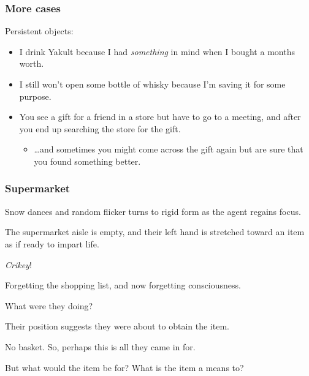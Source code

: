 \documentclass[noamssymb,
]{beamer} %
\begin{document}
\begin{frame}
  \frametitle{More cases}

  Persistent objects:
\begin{itemize}
\item I drink Yakult because I had \emph{something} in mind when I bought a months worth.
\item I still won't open some bottle of whisky because I'm saving it for some purpose.
\item You see a gift for a friend in a store but have to go to a meeting, and after you end up searching the store for the gift.
  \begin{itemize}
  \item \dots and sometimes you might come across the gift again but are sure that you found something better.
  \end{itemize}
\end{itemize}
\end{frame}


\begin{frame}
  \frametitle{Supermarket}

  {\rmfamily

    Snow dances and random flicker turns to rigid form as the agent regains focus.

    The supermarket aisle is empty, and their left hand is stretched toward an item as if ready to impart life.

    \emph{Crikey}!

    Forgetting the shopping list, and now forgetting consciousness.

    What were they doing?

    Their position suggests they were about to obtain the item.

    No basket. So, perhaps this is all they came in for.

    But what would the item be for?  What is the item a means to?

  }
\end{frame}
\end{document}
